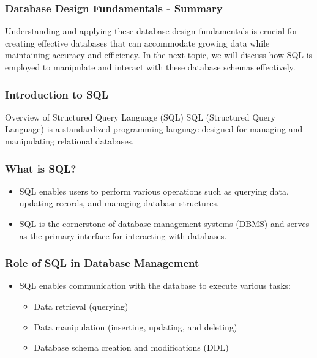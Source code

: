 \documentclass[aspectratio=169]{beamer}
\begin{document}
\begin{frame}[fragile]
    \frametitle{Database Design Fundamentals - Summary}
    Understanding and applying these database design fundamentals is crucial for creating effective databases that can accommodate growing data while maintaining accuracy and efficiency. In the next topic, we will discuss how SQL is employed to manipulate and interact with these database schemas effectively.
\end{frame}

\begin{frame}[fragile]
    \frametitle{Introduction to SQL}
    \begin{block}{Overview of Structured Query Language (SQL)}
        SQL (Structured Query Language) is a standardized programming language designed for managing and manipulating relational databases.
    \end{block}
\end{frame}

\begin{frame}[fragile]
    \frametitle{What is SQL?}
    \begin{itemize}
        \item SQL enables users to perform various operations such as querying data, updating records, and managing database structures.
        \item SQL is the cornerstone of database management systems (DBMS) and serves as the primary interface for interacting with databases.
    \end{itemize}
\end{frame}

\begin{frame}[fragile]
    \frametitle{Role of SQL in Database Management}
    \begin{itemize}
        \item SQL enables communication with the database to execute various tasks:
        \begin{itemize}
            \item Data retrieval (querying)
            \item Data manipulation (inserting, updating, and deleting)
            \item Database schema creation and modifications (DDL)
        \end{itemize}
    \end{itemize}
\end{frame}
\end{document}
